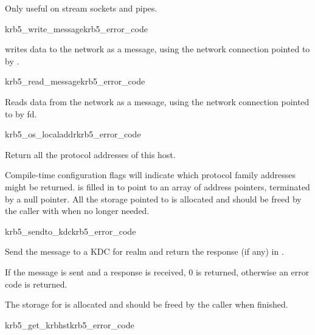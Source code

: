 Only useful on stream sockets and pipes.

\begin{funcdecl}{krb5_write_message}{krb5_error_code}{\funcin}
\end{funcdecl}


 writes data to the network as a message,
using the network connection pointed to by .

\begin{funcdecl}{krb5_read_message}{krb5_error_code}{\funcin}
\funcout
{}
\end{funcdecl}

Reads data from the network as a message, using the network connection
pointed to by fd.

\begin{funcdecl}{krb5_os_localaddr}{krb5_error_code}{\funcout}
\end{funcdecl}

Return all the protocol addresses of this host.

Compile-time configuration flags will indicate which protocol family
addresses might be returned.
 is filled in to point to an array of address pointers,
terminated by a null pointer.  All the storage pointed to is allocated
and should be freed by the caller with 
when no longer needed.


\begin{funcdecl}{krb5_sendto_kdc}{krb5_error_code}{\funcin}
\funcout
{}
\end{funcdecl}

Send the message  to a KDC for realm  and
return the response (if any) in .

If the message is sent and a response is received, 0 is returned,
otherwise an error code is returned.

The storage for  is allocated and should be freed by
the caller when finished.

\begin{funcdecl}{krb5_get_krbhst}{krb5_error_code}{\funcin}
\funcout
{}
\end{funcdecl}

